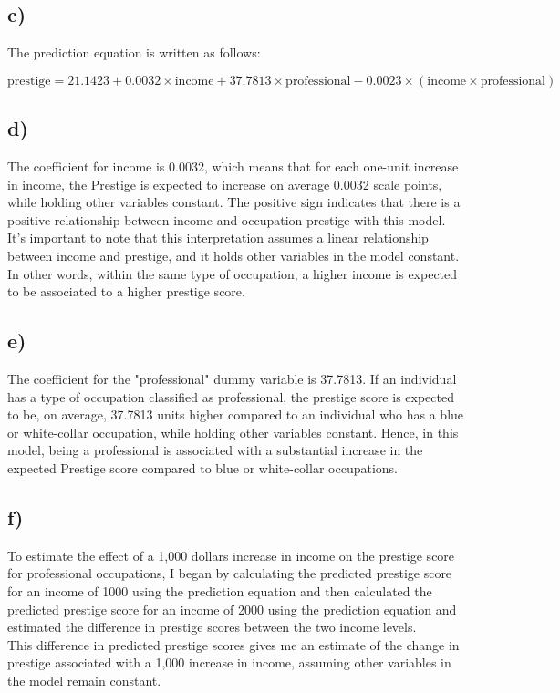 \documentclass[oneside]{article}
\begin{document}
\subsection*{c)}
The prediction equation is written as follows:

\[
\text{{prestige}} = 21.1423 + 0.0032 \times \text{{income}} + 37.7813 \times \text{{professional}} - 0.0023 \times (\text{{income}} \times \text{{professional}})
\]


\subsection*{d)}
The coefficient for income is 0.0032, which means that for each one-unit increase in income, the Prestige is expected to increase on average 0.0032 scale points, while holding other variables constant.
The positive sign indicates that there is a positive relationship between income and occupation prestige with this model. 
It's important to note that this interpretation assumes a linear relationship between income and prestige, and it holds other variables in the model constant. In other words, within the same type of occupation, a higher income is expected to be associated to a higher prestige score.

\subsection*{e)}
The coefficient for the "professional" dummy variable is 37.7813. If an individual has a type of occupation classified as professional, the prestige score is expected to be, on average, 37.7813 units higher compared to an individual who has a blue or white-collar occupation, while holding other variables constant.
Hence, in this model, being a professional is associated with a substantial increase in the expected Prestige score compared to blue or white-collar occupations.

\subsection*{f)}
To estimate the effect of a 1,000 dollars increase in income on the prestige score for professional occupations, I began by calculating the predicted prestige score for an income of 1000 using the prediction equation and then calculated the predicted prestige score for an income of 2000 using the prediction equation and estimated the difference in prestige scores between the two income levels.
\\
This difference in predicted prestige scores gives me an estimate of the change in prestige associated with a 1,000 increase in income, assuming other variables in the model remain constant.
\end{document}
